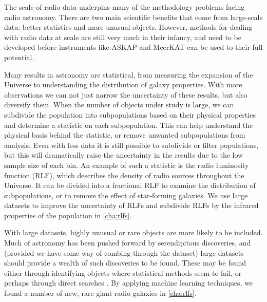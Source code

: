 \documentclass[11pt, a4paper]{book}
\begin{document}
    The scale of radio data underpins many of the methodology problems facing radio astronomy. There are two main scientific benefits that come from large-scale data: better statistics and more unusual objects. However, methods for dealing with radio data at scale are still very much in their infancy, and need to be developed before instruments like ASKAP and MeerKAT can be used to their full potential.

    Many results in astronomy are statistical, from measuring the expansion of the Universe to understanding the distribution of galaxy properties. With more observations we can not just narrow the uncertainty of these results, but also diversify them. When the number of objects under study is large, we can subdivide the population into subpopulations based on their physical properties and determine a statistic on each subpopulation. This can help understand the physical basis behind the statistic, or 
    remove unwanted subpopulations from analysis. Even with less data it is still possible to subdivide or filter populations, but this will dramatically raise the uncertainty in the results due to the low sample size of each bin. An example of such a statistic is the radio luminosity function (RLF), which describes the density of radio sources throughout the Universe. It can be divided into a fractional RLF to examine the distribution of subpopulations, or to remove the effect of star-forming galaxies. We use large datasets to improve the uncertainty of RLFs and subdivide RLFs by the infrared properties of the population in \autoref{cha:rlfs}.

    With large datasets, highly unusual or rare objects are more likely to be included. Much of astronomy has been pushed forward by serendipitous discoveries, and (provided we have some way of combing through the dataset) large datasets should provide a wealth of such discoveries to be found. These may be found either through identifying objects where statistical methods seem to fail, or perhaps through direct searches \citep{norris17unexpected}. By applying machine learning techniques, we found a number of new, rare giant radio galaxies in \autoref{cha:rlfs}.
\end{document}
